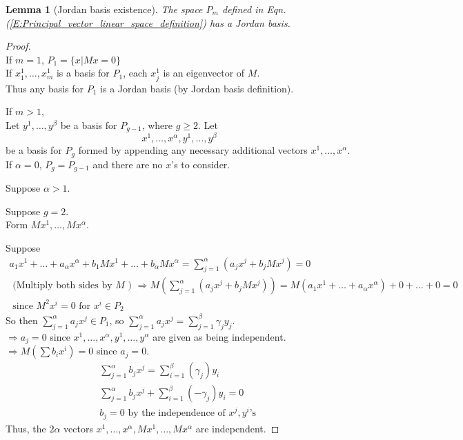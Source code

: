 \documentclass[twoside]{amsart}
\theoremstyle{plain}
\newtheorem{lemma}{Lemma}
\theoremstyle{definition}
\begin{document}
\begin{lemma}[Jordan basis existence]\label{L:Jordan_basis_existence}
  The space $P_m$ defined in Eqn. (\ref{E:Principal_vector_linear_space_definition}) has a Jordan basis. 
\end{lemma}
\begin{proof} \quad \\
  If $m=1$, $P_1 = \{ x | Mx =0 \}$ \\
  \phantom{If} If $x_1^1, \dots ,x_m^1$ is a basis for $P_1$, each $x_j^1$ is an eigenvector of $M$. \\
  \phantom{If I} Thus any basis for $P_1$ is a Jordan basis (by Jordan basis definition).  
  
If $m>1$, \\
\phantom{If } Let $y^1, \dots , y^{\beta}$ be a basis for $P_{g-1}$, where $g \geq 2 $.  Let
\begin{equation}\label{E:basis_for_P_g_Jordan_basis_existence_proof}
x^1, \dots , x^{\alpha} , y^1, \dots , y^{\beta}
\end{equation}
\phantom{If }be a basis for $P_g$ formed by appending any necessary additional vectors $x^1, \dots , x^{\alpha}$.\\
\phantom{If be } If $\alpha =0$, $P_g = P_{g-1}$ and there are no $x$'s to consider.  

Suppose $\alpha > 1$. 

Suppose $g=2$.  \\
\phantom{Sup} Form $Mx^1 , \dots , Mx^{\alpha}$.  

\phantom{Sup For} Suppose
\begin{gather*}
  a_1 x^1 + \dots + a_{\alpha} x^{\alpha} + b_1 M x^1 + \dots + b_{\alpha} M x^{\alpha} = \sum_{j=1}^{\alpha} (a_j x^j + b_j M x^j ) = 0 \\
  \text{ (Multiply both sides by $M$ ) } \Longrightarrow M \left( \sum_{j=1}^{\alpha} (a_j x^j + b_j M x^j ) \right) = M (a_1 x^1 + \dots + a_{\alpha}x^{\alpha} ) + 0 + \dots + 0 = 0 \\
  \text{ since } M^2 x^i = 0 \text{ for } x^i \in P_2
\end{gather*}
So then $\sum_{j=1}^{\alpha} a_j x^j \in P_1$, so $\sum_{j=1}^{\alpha} a_j x^j = \sum_{j=1}^{\beta} \gamma_j y_j$.  \\
\phantom{So} $\Longrightarrow a_j =0 $ since $x^1, \dots , x^{\alpha}, y^1 , \dots , y^{\alpha}$ are given as being independent.  \bigskip \\
$\Longrightarrow M(\sum b_i x^i ) = 0 $ since $a_j=0$.  
\[
\begin{gathered}
  \sum_{j=1}^{\alpha} b_j x^j = \sum_{i=1}^{\beta} (\gamma_j) y_i   \\
  \sum_{j=1}^{\alpha} b_j x^j + \sum_{i=1}^{\beta} (-\gamma_j) y_i = 0 \\
  b_j = 0 \text{ by the independence of $x^j, y^i$'s }
\end{gathered}
\]
Thus, the $2\alpha$ vectors $x^1, \dots , x^{\alpha}, Mx^1, \dots , Mx^{\alpha}$ are independent.  


\end{proof}
\end{document}
